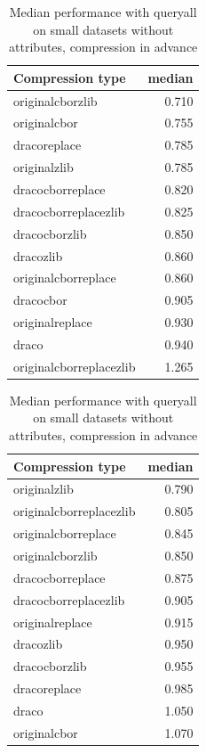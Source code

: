 \begin{table}[!h]
    \begin{minipage}{.5\linewidth}
      \caption{
Median performance with queryall on small datasets, compression in advance}
\centering

\begin{tabular}{|l|r|}
\hline
Compression type & median\\
\hline
originalcborzlib & 0.710\\
\hline
originalcbor & 0.755\\
\hline
dracoreplace & 0.785\\
\hline
originalzlib & 0.785\\
\hline
dracocborreplace & 0.820\\
\hline
dracocborreplacezlib & 0.825\\
\hline
dracocborzlib & 0.850\\
\hline
dracozlib & 0.860\\
\hline
originalcborreplace & 0.860\\
\hline
dracocbor & 0.905\\
\hline
originalreplace & 0.930\\
\hline
draco & 0.940\\
\hline
originalcborreplacezlib & 1.265\\
\hline
\end{tabular}
\end{minipage}%
    \begin{minipage}{.5\linewidth}
      \centering
        \caption{
Median performance with queryall on small datasets without attributes, compression in advance}

\begin{tabular}{|l|r|}
\hline
Compression type & median\\
\hline
originalzlib & 0.790\\
\hline
originalcborreplacezlib & 0.805\\
\hline
originalcborreplace & 0.845\\
\hline
originalcborzlib & 0.850\\
\hline
dracocborreplace & 0.875\\
\hline
dracocborreplacezlib & 0.905\\
\hline
originalreplace & 0.915\\
\hline
dracozlib & 0.950\\
\hline
dracocborzlib & 0.955\\
\hline
dracoreplace & 0.985\\
\hline
draco & 1.050\\
\hline
originalcbor & 1.070\\
\hline
\end{tabular}
\end{minipage} 
\end{table}

